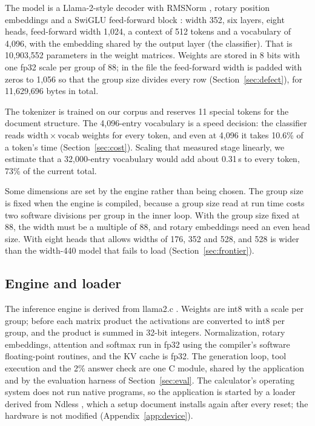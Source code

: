 \documentclass[10pt]{article}
\begin{document}
The model is a Llama-2-style decoder \citep{touvron2023llama} with RMSNorm \citep{zhang2019root},
rotary position embeddings \citep{su2021roformer} and a SwiGLU feed-forward block
\citep{shazeer2020variants}: width 352, six layers, eight heads, feed-forward width 1,024, a context
of 512 tokens and a vocabulary of 4,096, with the embedding shared by the output layer (the
classifier). That is 10,903,552 parameters in the weight matrices. Weights are stored in 8 bits with one fp32 scale per
group of 88; in the file the feed-forward width is padded with zeros to 1,056 so that the group size
divides every row (Section~\ref{sec:defect}), for 11,629,696 bytes in total.

The tokenizer is trained on our corpus and reserves 11 special tokens for the document structure.
The 4,096-entry vocabulary is a speed decision: the classifier reads $\mathrm{width}\times
\mathrm{vocab}$ weights for every token, and even at 4,096 it takes 10.6\% of a token's time
(Section~\ref{sec:cost}). Scaling that measured stage linearly, we estimate that a 32,000-entry
vocabulary would add about 0.31\,s to every token, 73\% of the current total.

Some dimensions are set by the engine rather than being chosen. The group size is fixed when the engine
is compiled, because a group size read at run time costs two software divisions per group in the inner
loop. With the group size fixed at 88, the width must be a multiple of 88, and rotary embeddings need an even head size. With eight
heads that allows widths of 176, 352 and 528, and 528 is wider than the width-440 model that fails to
load (Section~\ref{sec:frontier}).

\subsection{Engine and loader}

The inference engine is derived from llama2.c \citep{karpathy2023llama2c}. Weights are int8 with a
scale per group; before each matrix product the activations are converted to int8 per group, and the
product is summed in 32-bit integers. Normalization, rotary embeddings, attention and softmax run in
fp32 using the compiler's software floating-point routines, and the KV cache is fp32. The generation
loop, tool execution and the 2\% answer check are one C module, shared by the application and by the
evaluation harness of Section~\ref{sec:eval}. The calculator's operating system does not run native
programs, so the application is started by a loader derived from Ndless \citep{ndless}, which a
setup document installs again after every reset; the hardware is not modified (Appendix~\ref{app:device}).
\end{document}
